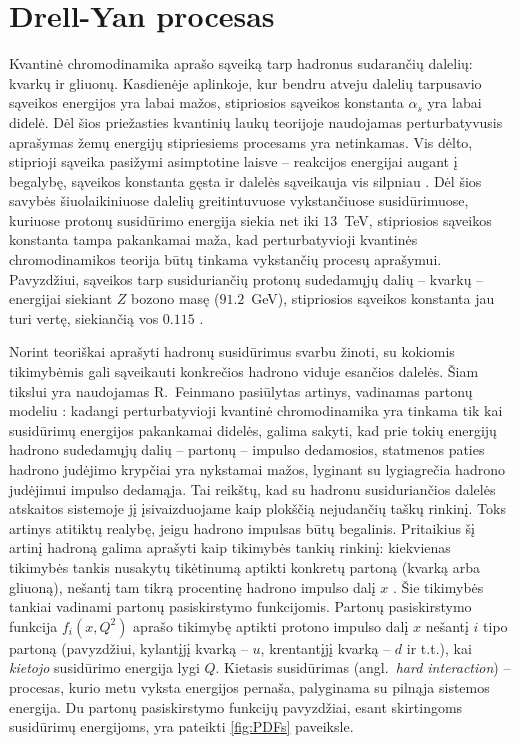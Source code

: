 \documentclass[a4paper, 12pt, oneside]{article}
\begin{document}
\section{Drell-Yan procesas}

Kvantinė chromodinamika aprašo sąveiką tarp hadronus sudarančių dalelių: kvarkų ir gliuonų.
Kasdienėje aplinkoje, kur bendru atveju dalelių tarpusavio sąveikos energijos yra labai mažos,
stipriosios sąveikos konstanta $\alpha_s$ yra labai didelė.
Dėl šios priežasties kvantinių laukų teorijoje naudojamas perturbatyvusis aprašymas žemų energijų stipriesiems procesams
yra netinkamas.
Vis dėlto, stiprioji sąveika pasižymi asimptotine laisve -- reakcijos energijai augant į begalybę, sąveikos konstanta
gęsta ir dalelės sąveikauja vis silpniau \cite{AFreedom}.
Dėl šios savybės šiuolaikiniuose dalelių greitintuvuose vykstančiuose susidūrimuose, kuriuose protonų susidūrimo energija
siekia net iki $13$~TeV, stipriosios sąveikos konstanta tampa pakankamai maža, kad perturbatyvioji kvantinės chromodinamikos
teorija būtų tinkama vykstančių procesų aprašymui.
Pavyzdžiui, sąveikos tarp susiduriančių protonų sudedamųjų dalių -- kvarkų -- energijai siekiant $Z$ bozono masę ($91.2$~GeV),
stipriosios sąveikos konstanta jau turi vertę, siekiančią vos $0.115$ \cite{PDF_ABMP16}.

Norint teoriškai aprašyti hadronų susidūrimus svarbu žinoti, su kokiomis tikimybėmis gali sąveikauti konkrečios
hadrono viduje esančios dalelės.
Šiam tikslui yra naudojamas R.~Feinmano pasiūlytas artinys, vadinamas partonų modeliu \cite{FeynPartons}:
kadangi perturbatyvioji kvantinė chromodinamika yra tinkama tik kai susidūrimų energijos pakankamai didelės,
galima sakyti, kad prie tokių energijų hadrono sudedamųjų dalių -- partonų -- impulso dedamosios, statmenos paties
hadrono judėjimo krypčiai yra nykstamai mažos, lyginant su lygiagrečia hadrono judėjimui impulso dedamąja.
Tai reikštų, kad su hadronu susiduriančios dalelės atskaitos sistemoje jį įsivaizduojame kaip plokščią nejudančių
taškų rinkinį.
Toks artinys atitiktų realybę, jeigu hadrono impulsas būtų begalinis.
Pritaikius šį artinį hadroną galima aprašyti kaip tikimybės tankių rinkinį: kiekvienas tikimybės tankis nusakytų tikėtinumą
aptikti konkretų partoną (kvarką arba gliuoną), nešantį tam tikrą procentinę hadrono impulso dalį $x$ \cite{BjorkPartons}.
Šie tikimybės tankiai vadinami partonų pasiskirstymo funkcijomis.
Partonų pasiskirstymo funkcija $f_{i}(x, Q^{2})$ aprašo tikimybę aptikti protono impulso
dalį $x$ nešantį $i$ tipo partoną (pavyzdžiui, kylantįjį kvarką -- $u$, krentantįjį
kvarką -- $d$ ir t.t.), kai \textit{kietojo} susidūrimo energija lygi $Q$.
Kietasis susidūrimas (angl.\ \textit{hard interaction}) -- procesas, kurio metu vyksta energijos pernaša, palyginama
su pilnąja sistemos energija.
Du partonų pasiskirstymo funkcijų pavyzdžiai, esant skirtingoms susidūrimų energijoms, yra pateikti
\ref{fig:PDFs} paveiksle.
\end{document}
